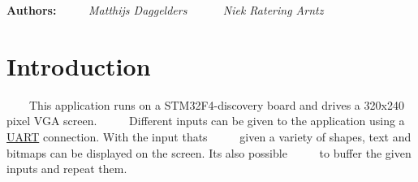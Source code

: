 {\bfseries Authors\+:}~\newline
 ~~~~{\itshape  Matthijs Daggelders }~\newline
 ~~~~{\itshape  Niek Ratering Arntz }~\newline
\hypertarget{index_intro_sec}{}\section{Introduction}\label{index_intro_sec}
~~~~This application runs on a S\+T\+M32\+F4-\/discovery board and drives a 320x240 pixel V\+GA screen.~\newline
 ~~~~Different inputs can be given to the application using a \mbox{\hyperlink{namespace_u_a_r_t}{U\+A\+RT}} connection. With the input thats~\newline
 ~~~~given a variety of shapes, text and bitmaps can be displayed on the screen. It\textquotesingle{}s also possible~\newline
 ~~~~to buffer the given inputs and repeat them.~\newline


